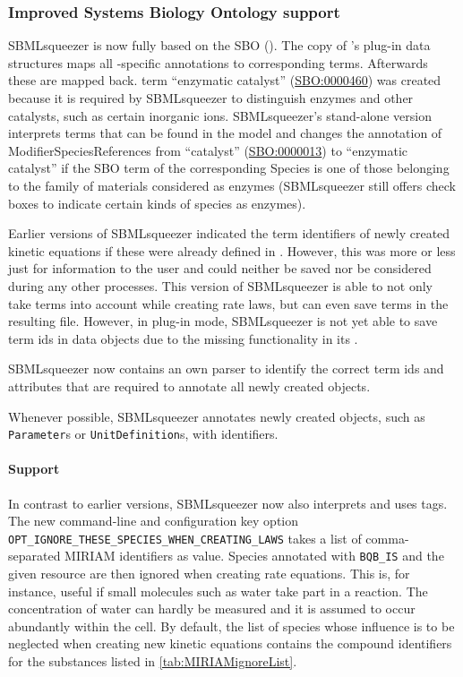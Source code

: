 \subsubsection{Improved Systems Biology Ontology support}

SBMLsqueezer is now fully based on the \acl{SBO} (\SBO). The \JSBML
copy of \CellDesigner's plug-in data structures maps all \CellDesigner-specific
annotations to corresponding \SBO terms. Afterwards these are mapped back. \SBO
term ``enzymatic catalyst''
(\href{identifiers.org/biomodels.sbo/SBO:0000460}{SBO:0000460}) was created
because it is required by SBMLsqueezer to distinguish enzymes and other
catalysts, such as certain inorganic ions. SBMLsqueezer's stand-alone version
interprets \SBO terms that can be found in the model and changes the annotation
of ModifierSpeciesReferences from ``catalyst''
(\href{identifiers.org/biomodels.sbo/SBO:0000013}{SBO:0000013}) to ``enzymatic
catalyst'' if the SBO term of the corresponding Species is one of those
belonging to the family of materials considered as enzymes (SBMLsqueezer still
offers check boxes to indicate certain kinds of species as enzymes).

Earlier versions of SBMLsqueezer indicated the \SBO term identifiers of newly
created kinetic equations if these were already defined in \SBO. However, this
was more or less just for information to the user and could neither be saved nor
be considered during any other processes. This version of SBMLsqueezer is able
to not only take \SBO terms into account while creating rate laws, but can even
save \SBO terms in the resulting \SBML file. However, in \CellDesigner plug-in
mode, SBMLsqueezer is not yet able to save \SBO term ids in \CellDesigner data
objects due to the missing functionality in its \API.

SBMLsqueezer now contains an own parser to identify the correct \SBO term ids and
attributes that are required to annotate all newly created objects.

Whenever possible, SBMLsqueezer annotates newly created objects, such as
\texttt{Parameter}s or \texttt{UnitDefinition}s, with \SBO identifiers.

\paragraph{\MIRIAM Support}

In contrast to earlier versions, SBMLsqueezer now also interprets and uses
\MIRIAM tags. The new command-line and configuration key option
\verb!OPT_IGNORE_THESE_SPECIES_WHEN_CREATING_LAWS! takes a list of
comma-separated MIRIAM identifiers as value. Species annotated with
\verb!BQB_IS! and the given \MIRIAM resource are then ignored when creating rate
equations. This is, for instance, useful if small molecules such as water take
part in a reaction. The concentration of water can hardly be measured and it is
assumed to occur abundantly within the cell. By default, the list of species
whose influence is to be neglected when creating new kinetic equations contains
the \KEGG compound identifiers for the substances listed in
\vref{tab:MIRIAMignoreList}.

